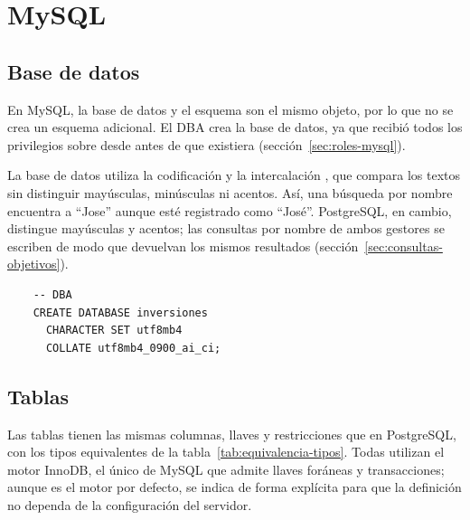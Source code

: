 \section{MySQL}

\subsection{Base de datos}

En MySQL, la base de datos y el esquema son el mismo objeto, por lo que no se crea un esquema adicional. El DBA crea la base de datos, ya que recibió todos los privilegios sobre  desde antes de que existiera (sección~\ref{sec:roles-mysql}).

La base de datos utiliza la codificación  y la intercalación , que compara los textos sin distinguir mayúsculas, minúsculas ni acentos. Así, una búsqueda por nombre encuentra a ``Jose'' aunque esté registrado como ``José''. PostgreSQL, en cambio, distingue mayúsculas y acentos; las consultas por nombre de ambos gestores se escriben de modo que devuelvan los mismos resultados (sección~\ref{sec:consultas-objetivos}).

\begin{verbatim}
	-- DBA
	CREATE DATABASE inversiones
	  CHARACTER SET utf8mb4
	  COLLATE utf8mb4_0900_ai_ci;
\end{verbatim}

\subsection{Tablas}

Las tablas tienen las mismas columnas, llaves y restricciones que en PostgreSQL, con los tipos equivalentes de la tabla~\ref{tab:equivalencia-tipos}. Todas utilizan el motor InnoDB, el único de MySQL que admite llaves foráneas y transacciones; aunque es el motor por defecto, se indica de forma explícita para que la definición no dependa de la configuración del servidor.

